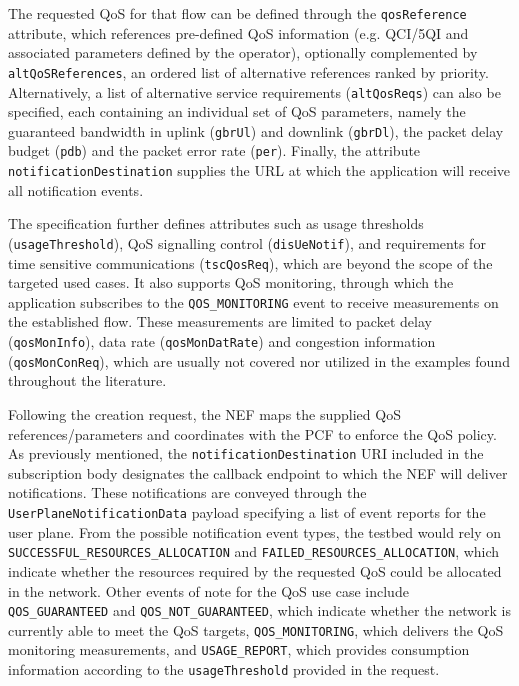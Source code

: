 The requested \acs{QoS} for that flow can be defined through the \texttt{qosReference} attribute, which references pre-defined \acs{QoS} information (e.g. \acs{QCI}/\acs{5QI} and associated parameters defined by the operator), optionally complemented by \texttt{altQoSReferences}, an ordered list of alternative references ranked by priority. Alternatively, a list of alternative service requirements (\texttt{altQosReqs}) can also be specified, each containing an individual set of \acs{QoS} parameters, namely the guaranteed bandwidth in uplink (\texttt{gbrUl}) and downlink (\texttt{gbrDl}), the packet delay budget (\texttt{pdb}) and the packet error rate (\texttt{per}). Finally, the attribute \texttt{notificationDestination} supplies the \acs{URL} at which the application will receive all notification events.

The specification further defines attributes such as usage thresholds (\texttt{usageThreshold}), \acs{QoS} signalling control (\texttt{disUeNotif}), and requirements for time sensitive communications (\texttt{tscQosReq}), which are beyond the scope of the targeted used cases. It also supports \acs{QoS} monitoring, through which the application subscribes to the \texttt{QOS\_MONITORING} event to receive measurements on the established flow. These measurements are limited to packet delay (\texttt{qosMonInfo}), data rate (\texttt{qosMonDatRate}) and congestion information (\texttt{qosMonConReq}), which are usually not covered nor utilized in the examples found throughout the literature.

Following the creation request, the \acs{NEF} maps the supplied \acs{QoS} references/parameters and coordinates with the \acs{PCF} to enforce the \acs{QoS} policy. As previously mentioned, the \texttt{notificationDestination} \acs{URI} included in the subscription body designates the callback endpoint to which the \acs{NEF} will deliver notifications. These notifications are conveyed through the \texttt{UserPlaneNotificationData} payload specifying a list of event reports for the user plane. From the possible notification event types, the testbed would rely on \texttt{SUCCESSFUL\_RESOURCES\_ALLOCATION} and \texttt{FAILED\_RESOURCES\_ALLOCATION}, which indicate whether the resources required by the requested \acs{QoS} could be allocated in the network. Other events of note for the \acs{QoS} use case include \texttt{QOS\_GUARANTEED} and \texttt{QOS\_NOT\_GUARANTEED}, which indicate whether the network is currently able to meet the \acs{QoS} targets, \texttt{QOS\_MONITORING}, which delivers the \acs{QoS} monitoring measurements, and \texttt{USAGE\_REPORT}, which provides consumption information according to the \texttt{usageThreshold} provided in the request.


